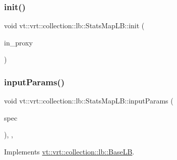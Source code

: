 \subsubsection{\texorpdfstring{init()}{init()}}
{\footnotesize\ttfamily void vt\+::vrt\+::collection\+::lb\+::\+Stats\+Map\+L\+B\+::init (\begin{DoxyParamCaption}\item[{\hyperlink{structvt_1_1objgroup_1_1proxy_1_1_proxy}{objgroup\+::proxy\+::\+Proxy}$<$ \hyperlink{structvt_1_1vrt_1_1collection_1_1lb_1_1_stats_map_l_b}{Stats\+Map\+LB} $>$}]{in\+\_\+proxy }\end{DoxyParamCaption})}

\mbox{\label{structvt_1_1vrt_1_1collection_1_1lb_1_1_stats_map_l_b_a495d91782f11c1bb5d1774a05b2a73f6}} 
\subsubsection{\texorpdfstring{input\+Params()}{inputParams()}}
{\footnotesize\ttfamily void vt\+::vrt\+::collection\+::lb\+::\+Stats\+Map\+L\+B\+::input\+Params (\begin{DoxyParamCaption}\item[{\hyperlink{structvt_1_1vrt_1_1collection_1_1balance_1_1_spec_entry}{balance\+::\+Spec\+Entry} $\ast$}]{spec }\end{DoxyParamCaption})\hspace{0.3cm}{\ttfamily [inline]}, {\ttfamily [override]}, {\ttfamily [virtual]}}



Implements \hyperlink{structvt_1_1vrt_1_1collection_1_1lb_1_1_base_l_b_a555e29aadfd428383464d6dd007506b6}{vt\+::vrt\+::collection\+::lb\+::\+Base\+LB}.

\mbox{\label{structvt_1_1vrt_1_1collection_1_1lb_1_1_stats_map_l_b_a8cf644da07b97637eb00c5384a59ee1e}} 
